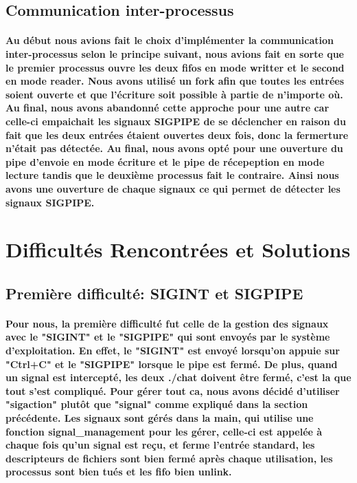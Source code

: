 \documentclass[utf8]{article}
\begin{document}
\subsection{Communication inter-processus}
\paragraph{Au début nous avions fait le choix d'implémenter la communication inter-processus selon le principe
 suivant, nous avions fait en sorte que le premier processus ouvre les deux fifos en mode writter et le second en mode reader.
 Nous avons utilisé un fork afin que toutes les entrées soient ouverte et que l'écriture soit possible à partie de n'importe où.
 Au final, nous avons abandonné cette approche pour une autre car celle-ci empaichait les signaux 
 SIGPIPE de se déclencher en raison du fait que les deux entrées étaient ouvertes deux fois, donc la fermerture n'était pas détectée.
 Au final, nous avons opté pour une ouverture du pipe d'envoie en mode écriture et le pipe de 
 récepeption en mode lecture tandis que le deuxième processus fait le contraire. Ainsi nous avons une ouverture de chaque signaux ce qui permet de détecter les signaux SIGPIPE.}
 

\section{Difficultés Rencontrées et Solutions}

\subsection{Première difficulté: SIGINT et SIGPIPE}
\paragraph{Pour nous, la première difficulté fut celle de la gestion des signaux avec le "SIGINT" et le "SIGPIPE"
qui sont envoyés par le système d'exploitation. En effet, le "SIGINT" est envoyé lorsqu'on appuie sur "Ctrl+C" et le "SIGPIPE" lorsque le pipe est fermé.
De plus, quand un signal est intercepté, les deux ./chat doivent être fermé, c'est la que tout s'est compliqué.
Pour gérer tout ca, nous avons décidé d'utiliser "sigaction" plutôt que "signal" comme expliqué dans la section précédente.
Les signaux sont gérés dans la main, qui utilise une fonction signal\_management pour les gérer, celle-ci est appelée à chaque fois qu'un signal est reçu, 
et ferme l'entrée standard, les descripteurs de fichiers sont bien fermé après chaque utilisation, les processus sont bien tués et les fifo bien unlink.}
\end{document}
